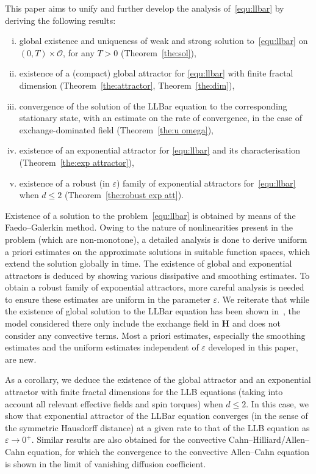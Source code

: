 \documentclass[11pt, reqno]{amsart}
\theoremstyle{definition}
\numberwithin{equation}{section}
\newcommand{\bff}{\boldsymbol}
\begin{document}
This paper aims to unify and further develop the analysis of~\eqref{equ:llbar} by deriving the following results:
\begin{enumerate}[(i)]
	\item global existence and uniqueness of weak and strong solution to~\eqref{equ:llbar} on $(0,T)\times \mathscr{O}$, for any $T>0$ (Theorem~\ref{the:sol}),
	\item existence of a (compact) global attractor for \eqref{equ:llbar} with finite fractal dimension (Theorem~\ref{the:attractor}, Theorem~\ref{the:dim}),
    \item convergence of the solution of the LLBar equation to the corresponding stationary state, with an estimate on the rate of convergence, in the case of exchange-dominated field (Theorem~\ref{the:u omega}),
	\item existence of an exponential attractor for \eqref{equ:llbar} and its characterisation (Theorem~\ref{the:exp attractor}),
    \item existence of a robust (in $\varepsilon$) family of exponential attractors for~\eqref{equ:llbar} when $d\leq 2$ (Theorem~\ref{the:robust exp att}).
\end{enumerate}
Existence of a solution to the problem~\eqref{equ:llbar} is obtained by means of the Faedo--Galerkin method. Owing to the nature of nonlinearities present in the problem (which are non-monotone), a detailed analysis is done to derive uniform a priori estimates on the approximate solutions in suitable function spaces, which extend the solution globally in time. The existence of global and exponential attractors is deduced by showing various dissipative and smoothing estimates. To obtain a robust family of exponential attractors, more careful analysis is needed to ensure these estimates are uniform in the parameter $\varepsilon$. We reiterate that while the existence of global solution to the LLBar equation has been shown in~\cite{SoeTra23}, the model considered there only include the exchange field in $\bff{H}$ and does not consider any convective terms. Most a priori estimates, especially the smoothing estimates and the uniform estimates independent of $\varepsilon$ developed in this paper, are new.


As a corollary, we deduce the existence of the global attractor and an exponential attractor with finite fractal dimensions for the LLB equations (taking into account all relevant effective fields and spin torques) when $d\leq 2$. In this case, we show that exponential attractor of the LLBar equation converges (in the sense of the symmetric Hausdorff distance) at a given rate to that of the LLB equation as $\varepsilon\to 0^+$. Similar results are also obtained for the convective Cahn--Hilliard/Allen--Cahn equation, for which the convergence to the convective Allen--Cahn equation is shown in the limit of vanishing diffusion coefficient.
\end{document}
